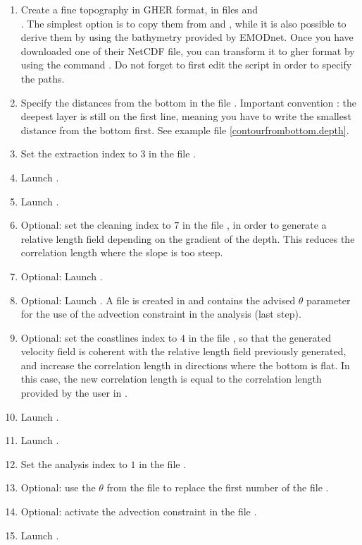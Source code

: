 \begin{enumerate}
 \item Create a fine topography in GHER format, in files  and \\ . The simplest option is to copy them from  and , while it is also possible to derive them by using the bathymetry provided by EMODnet. Once you have downloaded one of their NetCDF file, you can transform it to gher format by using the command . Do not forget to first edit the script in order to specify the paths.
 \item Specify the distances from the bottom in the file . Important convention : the deepest layer is still on the first line, meaning you have to write the smallest distance from the bottom first. See example file \ref{contourfrombottom.depth}.
 \item Set the extraction index to $3$ in the file .
 \item Launch .
 \item Launch .
 \item Optional: set the cleaning index to $7$ in the file , in order to generate a relative length field depending on the gradient of the depth. This reduces the correlation length where the slope is too steep.
 \item Optional: Launch .
 \item Optional: Launch . A file  is created in  and contains the advised $\theta$ parameter for the use of the advection constraint in the analysis (last step).
 \item Optional: set the coastlines index to $4$ in the file , so that the generated velocity field is coherent with the relative length field previously generated, and increase the correlation length in directions where the bottom is flat. In this case, the new correlation length is equal to the correlation length provided by the user in .
 \item Launch .
 \item Launch .
 \item Set the analysis index to $1$ in the file .
 \item Optional: use the $\theta$ from the file  to replace the first number of the file .
 \item Optional: activate the advection constraint in the file .
 \item Launch .
\end{enumerate}

